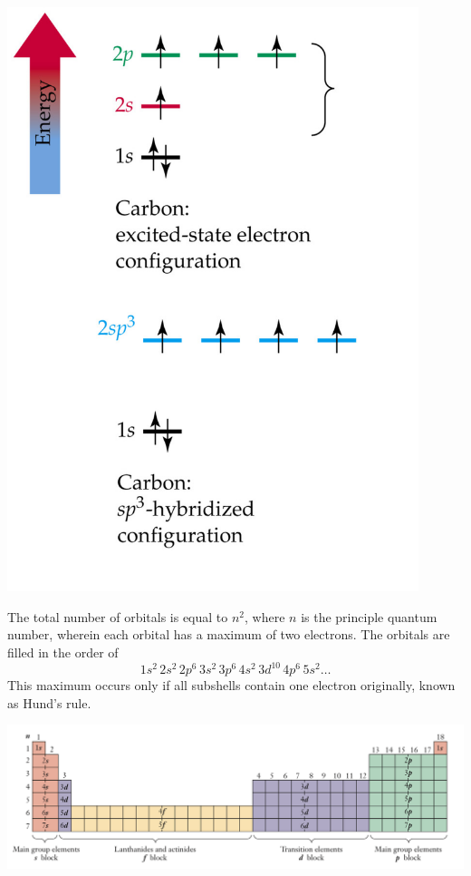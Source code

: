 \documentclass{tufte-book}
\begin{document}
\begin{marginfigure}[3cm]
\begin{center}
  \includegraphics[width=0.9\textwidth]{orbitals} \phantom{mmm}
\end{center}
\end{marginfigure}
%
The total number of orbitals is equal to $n^2$, where $n$ is the principle quantum number, wherein each orbital has a maximum of two electrons. The orbitals are filled in the order of \begin{equation}
  1s^2 \, 2s^2 \, 2p^6 \, 3s^2 \, 3p^6 \, 4s^2 \, 3d^{10} \, 4p^6 \, 5s^2 \dots
\end{equation}
This maximum occurs only if all subshells contain one electron originally, known as Hund's rule.

\begin{center}
  \includegraphics[width=\textwidth]{table}
\end{center}
\end{document}
